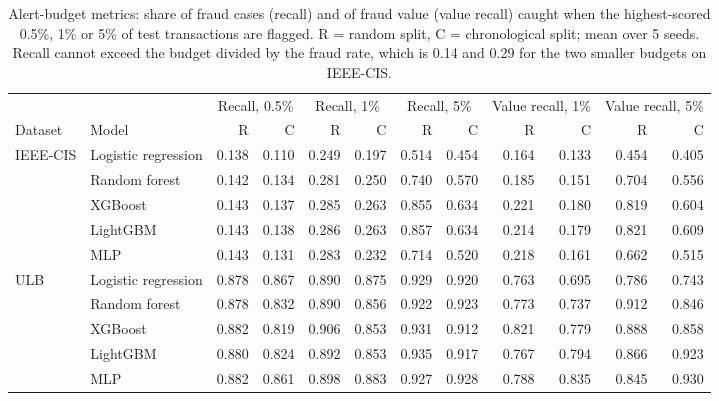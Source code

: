 \begin{table}[htbp]
\caption{Alert-budget metrics: share of fraud cases (recall) and of fraud value (value recall) caught when the highest-scored 0.5\%, 1\% or 5\% of test transactions are flagged. R = random split, C = chronological split; mean over 5 seeds. Recall cannot exceed the budget divided by the fraud rate, which is 0.14 and 0.29 for the two smaller budgets on IEEE-CIS.}
\label{tab:budget}
\small
\begin{tabular}{llrrrrrrrrrr}
\toprule
 &  & \multicolumn{2}{c}{Recall, 0.5\%} & \multicolumn{2}{c}{Recall, 1\%} & \multicolumn{2}{c}{Recall, 5\%} & \multicolumn{2}{c}{Value recall, 1\%} & \multicolumn{2}{c}{Value recall, 5\%} \\
\cmidrule(lr){3-4}\cmidrule(lr){5-6}\cmidrule(lr){7-8}\cmidrule(lr){9-10}\cmidrule(lr){11-12}
Dataset & Model & R & C & R & C & R & C & R & C & R & C \\
\midrule
IEEE-CIS & Logistic regression & 0.138 & 0.110 & 0.249 & 0.197 & 0.514 & 0.454 & 0.164 & 0.133 & 0.454 & 0.405 \\
 & Random forest & 0.142 & 0.134 & 0.281 & 0.250 & 0.740 & 0.570 & 0.185 & 0.151 & 0.704 & 0.556 \\
 & XGBoost & 0.143 & 0.137 & 0.285 & 0.263 & 0.855 & 0.634 & 0.221 & 0.180 & 0.819 & 0.604 \\
 & LightGBM & 0.143 & 0.138 & 0.286 & 0.263 & 0.857 & 0.634 & 0.214 & 0.179 & 0.821 & 0.609 \\
 & MLP & 0.143 & 0.131 & 0.283 & 0.232 & 0.714 & 0.520 & 0.218 & 0.161 & 0.662 & 0.515 \\
\addlinespace
ULB & Logistic regression & 0.878 & 0.867 & 0.890 & 0.875 & 0.929 & 0.920 & 0.763 & 0.695 & 0.786 & 0.743 \\
 & Random forest & 0.878 & 0.832 & 0.890 & 0.856 & 0.922 & 0.923 & 0.773 & 0.737 & 0.912 & 0.846 \\
 & XGBoost & 0.882 & 0.819 & 0.906 & 0.853 & 0.931 & 0.912 & 0.821 & 0.779 & 0.888 & 0.858 \\
 & LightGBM & 0.880 & 0.824 & 0.892 & 0.853 & 0.935 & 0.917 & 0.767 & 0.794 & 0.866 & 0.923 \\
 & MLP & 0.882 & 0.861 & 0.898 & 0.883 & 0.927 & 0.928 & 0.788 & 0.835 & 0.845 & 0.930 \\
\bottomrule
\end{tabular}
\end{table}
